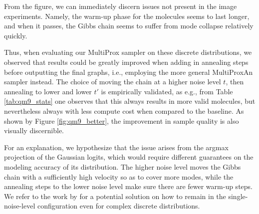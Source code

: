 From the figure, we can immediately discern issues not present in the image experiments. Namely, the warm-up phase for the molecules seems to last longer, and when it passes, the Gibbs chain seems to suffer from mode collapse relatively quickly.

Thus, when evaluating our MultiProx sampler on these discrete distributions, we observed that results could be greatly improved when adding in annealing steps before outputting the final graphs, i.e., employing the more general MultiProxAn sampler instead. The choice of moving the chain at a higher noise level $t$, then annealing to lower and lower $t'$ is empirically validated, as e.g., from Table \ref{tab:qm9_stats} one observes that this always results in more valid molecules, but nevertheless always with less compute cost when compared to the baseline. As shown by Figure \ref{fig:qm9_better}, the improvement in sample quality is also visually discernible. 

For an explanation, we hypothesize that the issue arises from the argmax projection of the Gaussian logits, which would require different guarantees on the modeling accuracy of its distribution. The higher noise level moves the Gibbs chain with a sufficiently high velocity so as to cover more modes, while the annealing steps to the lower noise level make sure there are fewer warm-up steps. We refer to the work by \cite{sahoo_diffusion_2025} for a potential solution on how to remain in the single-noise-level configuration even for complex discrete distributions. 

